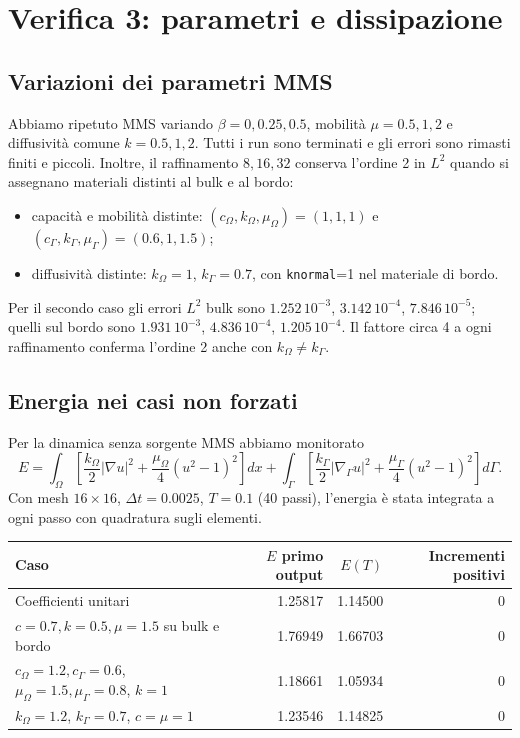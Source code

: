 \documentclass[11pt,a4paper]{article}
\begin{document}
\section{Verifica 3: parametri e dissipazione}
\subsection*{Variazioni dei parametri MMS}
Abbiamo ripetuto MMS variando $\beta=0,0.25,0.5$, mobilità $\mu=0.5,1,2$ e diffusività comune $k=0.5,1,2$. Tutti i run sono terminati e gli errori sono rimasti finiti e piccoli. Inoltre, il raffinamento $8,16,32$ conserva l'ordine 2 in $L^2$ quando si assegnano materiali distinti al bulk e al bordo:
\begin{itemize}
 \item capacità e mobilità distinte: $(c_\Omega,k_\Omega,\mu_\Omega)=(1,1,1)$ e $(c_\Gamma,k_\Gamma,\mu_\Gamma)=(0.6,1,1.5)$;
 \item diffusività distinte: $k_\Omega=1$, $k_\Gamma=0.7$, con \texttt{knormal}=1 nel materiale di bordo.
\end{itemize}
Per il secondo caso gli errori $L^2$ bulk sono $1.252\,10^{-3}$, $3.142\,10^{-4}$, $7.846\,10^{-5}$; quelli sul bordo sono $1.931\,10^{-3}$, $4.836\,10^{-4}$, $1.205\,10^{-4}$. Il fattore circa 4 a ogni raffinamento conferma l'ordine 2 anche con $k_\Omega\ne k_\Gamma$.

\subsection*{Energia nei casi non forzati}
Per la dinamica senza sorgente MMS abbiamo monitorato
\[
 E=\int_\Omega\left[\frac{k_\Omega}{2}|\nabla u|^2+
       \frac{\mu_\Omega}{4}(u^2-1)^2\right]dx+
   \int_\Gamma\left[\frac{k_\Gamma}{2}|\nabla_\Gamma u|^2+
       \frac{\mu_\Gamma}{4}(u^2-1)^2\right]d\Gamma.
\]
Con mesh $16\times16$, $\Delta t=0.0025$, $T=0.1$ (40 passi), l'energia è stata integrata a ogni passo con quadratura sugli elementi.

\begin{center}
\small
\begin{tabular}{lrrr}
\toprule
Caso & $E$ primo output & $E(T)$ & Incrementi positivi\\
\midrule
Coefficienti unitari & 1.25817 & 1.14500 & 0\\
$c=0.7, k=0.5, \mu=1.5$ su bulk e bordo & 1.76949 & 1.66703 & 0\\
$c_\Omega=1.2, c_\Gamma=0.6$, $\mu_\Omega=1.5,\mu_\Gamma=0.8$, $k=1$ & 1.18661 & 1.05934 & 0\\
$k_\Omega=1.2$, $k_\Gamma=0.7$, $c=\mu=1$ & 1.23546 & 1.14825 & 0\\
\bottomrule
\end{tabular}
\end{center}
\end{document}
